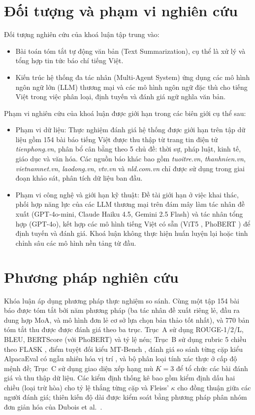 \section*{Đối tượng và phạm vi nghiên cứu}

Đối tượng nghiên cứu của khoá luận tập trung vào:
\begin{itemize}
  \item Bài toán tóm tắt tự động văn bản (Text Summarization), cụ thể là xử lý và tổng hợp tin tức báo chí tiếng Việt.
  \item Kiến trúc hệ thống đa tác nhân (Multi-Agent System) ứng dụng các mô hình ngôn ngữ lớn (LLM) thương mại và các mô hình ngôn ngữ đặc thù cho tiếng Việt trong việc phân loại, định tuyến và đánh giá ngữ nghĩa văn bản.
\end{itemize}

Phạm vi nghiên cứu của khoá luận được giới hạn trong các biên giới cụ thể sau:
\begin{itemize}
  \item Phạm vi dữ liệu: Thực nghiệm đánh giá hệ thống được giới hạn trên tập dữ liệu gồm 154 bài báo tiếng Việt được thu thập từ trang tin điện tử \textit{tienphong.vn}, phân bổ cân bằng theo 5 chủ đề: thời sự, pháp luật, kinh tế, giáo dục và văn hóa. Các nguồn báo khác bao gồm \textit{tuoitre.vn}, \textit{thanhnien.vn}, \textit{vietnamnet.vn}, \textit{laodong.vn}, \textit{vtv.vn} và \textit{nld.com.vn} chỉ được sử dụng trong giai đoạn khảo sát, phân tích dữ liệu ban đầu.
  \item Phạm vi công nghệ và giới hạn kỹ thuật: Đề tài giới hạn ở việc khai thác, phối hợp năng lực của các LLM thương mại trên đám mây làm tác nhân đề xuất (GPT-4o-mini, Claude Haiku 4.5, Gemini 2.5 Flash) và tác nhân tổng hợp (GPT-4o), kết hợp các mô hình tiếng Việt có sẵn (ViT5 \cite{Nguyen2022}, PhoBERT \cite{Nguyen2020}) để định tuyến và đánh giá. Khoá luận không thực hiện huấn luyện lại hoặc tinh chỉnh sâu các mô hình nền tảng từ đầu.
\end{itemize}

\section*{Phương pháp nghiên cứu}

Khóa luận áp dụng phương pháp thực nghiệm so sánh. Cùng một tập 154 bài báo được tóm
tắt bởi năm phương pháp (ba tác nhân đề xuất riêng lẻ, đầu ra dung hợp MoA, và mô hình
đơn lẻ cơ sở lựa chọn bản thảo tốt nhất), và 770 bản tóm tắt thu được được đánh giá
theo ba trục. Trục~A sử dụng ROUGE-1/2/L, BLEU, BERTScore (với PhoBERT) và tỷ lệ nén;
Trục~B sử dụng rubric 5 chiều theo FLASK \cite{Ye2023}, điểm tuyệt đối kiểu MT-Bench
\cite{Zheng2023}, đánh giá so sánh từng cặp kiểu AlpacaEval có ngẫu nhiên hóa vị trí
\cite{Dubois2024}, và bộ phân loại tính xác thực ở cấp độ mệnh đề; Trục~C sử dụng giao
diện xếp hạng mù $K = 3$ để tổ chức các bài đánh giá và thu thập dữ liệu. Các kiểm định thống kê bao gồm kiểm định dấu hai chiều (loại trừ hòa) cho tỷ
lệ thắng từng cặp và Fleiss' $\kappa$ \cite{Landis1977} cho đồng thuận giữa các người
đánh giá; thiên kiến độ dài được kiểm soát bằng phương pháp phân nhóm đơn giản hóa của
Dubois et al.\ \cite{Dubois2024}.

